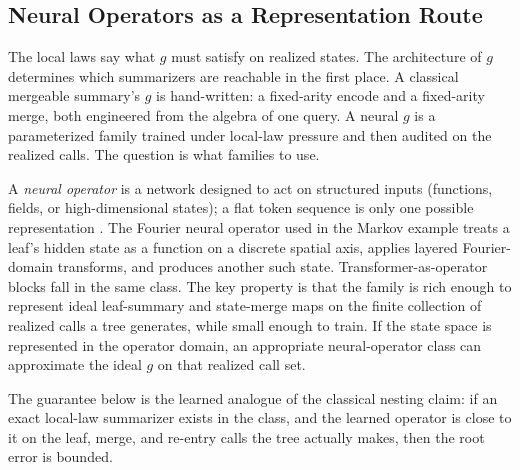 \subsection{Neural Operators as a Representation Route}
\label{sec:v7-neural-operator-route}

The local laws say what \(g\) must satisfy on realized states. The
architecture of \(g\) determines which summarizers are reachable in the
first place. A classical mergeable summary's \(g\) is hand-written: a
fixed-arity encode and a fixed-arity merge, both engineered from the
algebra of one query. A neural \(g\) is a parameterized family trained
under local-law pressure and then audited on the realized calls. The
question is what families to use.

A \emph{neural operator} is a network designed to act on structured
inputs (functions, fields, or high-dimensional states); a flat token
sequence is only one possible representation
\citep{Kovachki23NeuralOperator}. The Fourier neural operator used in
the Markov example treats a leaf's hidden state as a function on a
discrete spatial axis, applies layered Fourier-domain transforms, and
produces another such state. Transformer-as-operator blocks fall in the
same class. The key property is that the family is rich enough to
represent ideal leaf-summary and state-merge maps on the finite
collection of realized calls a tree generates, while small enough to
train. If the state space is represented in the operator domain, an
appropriate neural-operator class can approximate the ideal \(g\) on
that realized call set.

The guarantee below is the learned analogue of the classical nesting
claim: if an exact local-law summarizer exists in the class, and the
learned operator is close to it on the leaf, merge, and re-entry calls
the tree actually makes, then the root error is bounded.


